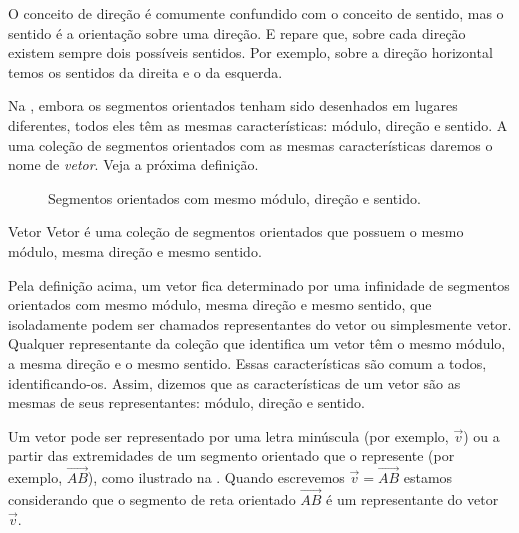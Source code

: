 O conceito de direção é comumente confundido com o conceito de sentido, mas o sentido é a orientação sobre uma direção. E repare que, sobre cada direção existem sempre dois possíveis sentidos. Por exemplo, sobre a direção horizontal temos os sentidos da direita e o da esquerda.

Na , embora os segmentos orientados tenham sido desenhados em lugares diferentes, todos eles têm as mesmas características: módulo, direção e sentido. A uma coleção de segmentos orientados com as mesmas características daremos o nome de \textit{vetor}. Veja a próxima definição.

\begin{figure}[H]
\centering
{}
\caption{Segmentos orientados com mesmo módulo, direção e sentido.
\label{fig-geometria-operacoesvetores-04}}
\end{figure}

\begin{observationtitle}{Vetor}
Vetor é uma coleção de segmentos orientados que possuem o mesmo módulo, mesma direção e mesmo sentido.
\end{observationtitle}

Pela definição acima, um vetor fica determinado por uma infinidade de segmentos orientados com mesmo módulo, mesma direção e mesmo sentido, que isoladamente podem ser chamados representantes do vetor ou simplesmente vetor. Qualquer representante da coleção que identifica um vetor têm o mesmo módulo, a mesma direção e o mesmo sentido. Essas características são comum a todos, identificando-os. Assim, dizemos que as características de um vetor são as mesmas de seus representantes: módulo, direção e sentido.

Um vetor pode ser representado por uma letra minúscula (por exemplo, \(\vec{v}\)) ou a partir das extremidades de um segmento orientado que o represente (por exemplo, \(\overrightarrow{AB}\)), como ilustrado na . Quando escrevemos \(\vec{v}=\overrightarrow{AB}\) estamos considerando que o segmento de reta orientado \(\overrightarrow{AB}\) é um representante do vetor \(\vec{v}\).

